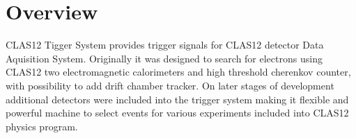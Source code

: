 \section{Overview}

CLAS12 Tigger System provides trigger signals for CLAS12 detector Data Aquisition System\cite{einstein}. Originally it was designed to search for electrons using CLAS12 two electromagnetic calorimeters and high threshold cherenkov counter, with possibility to add drift chamber tracker. On later stages of development additional detectors were included into the trigger system making it flexible and powerful machine to select events for various experiments included into CLAS12 physics program.



